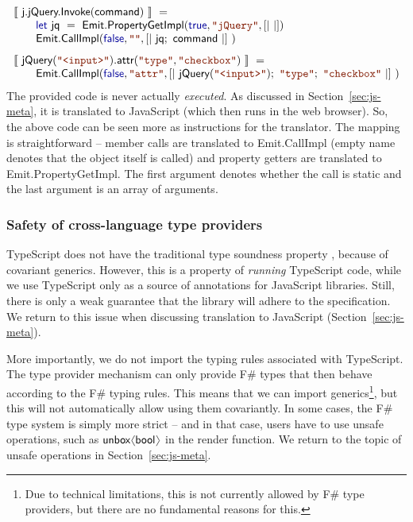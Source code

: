 \documentclass[submission,copyright,creativecommons]{eptcs}
\newcommand{\langl}{\begin{picture}(4.5,7)
\put(1.1,2.5){\rotatebox{60}{\line(1,0){5.5}}}
\put(1.1,2.5){\rotatebox{300}{\line(1,0){5.5}}}
\end{picture}}
\newcommand{\rangl}{\begin{picture}(4.5,7)
\put(.9,2.5){\rotatebox{120}{\line(1,0){5.5}}}
\put(.9,2.5){\rotatebox{240}{\line(1,0){5.5}}}
\end{picture}}
\newcommand{\sem}[1]{\llbracket #1 \rrbracket}
\newcommand{\kvd}[1]{\textnormal{\textcolor{kvdclr}{\sffamily #1}}}
\newcommand{\str}[1]{\textnormal{\textcolor{strclr}{\ttfamily "#1"}}}
\newcommand{\ident}[1]{\textnormal{\sffamily #1}}
\begin{document}
\begin{equation*}
\begin{array}{l}
 \sem{~\ident{j.jQuery.Invoke}(\ident{command})~} ~= \\
 \qquad \kvd{let}~\ident{jq}~=~\ident{Emit.PropertyGetImpl}(\kvd{true}, \str{jQuery}, \lbrack|~|\rbrack) \\
 \qquad \ident{Emit.CallImpl}(\kvd{false}, \str{}, \lbrack|~ \ident{jq};~ \ident{command}~|\rbrack~) \\[0.75em]
 \sem{~\ident{jQuery}(\str{<input>})\ident{.attr}(\str{type},\str{checkbox})~} ~= \\
 \qquad \ident{Emit.CallImpl}(\kvd{false}, \str{attr}, \lbrack|~ \ident{jQuery}(\str{<input>});~\str{type};~\str{checkbox}~|\rbrack~)
\end{array}
\end{equation*}
%
The provided code is never actually \emph{executed}. As discussed in Section~\ref{sec:js-meta}, it
is translated to JavaScript (which then runs in the web browser). So, the above code can be seen
more as instructions for the translator. The mapping is straightforward -- member calls are
translated to \ident{Emit.CallImpl} (empty name denotes that the object itself is called) and
property getters are translated to \ident{Emit.PropertyGetImpl}. The first argument
denotes whether the call is static and the last argument is an array of arguments.

\subsubsection{Safety of cross-language type providers}
TypeScript does not have the traditional type soundness property \cite{ms-safets},
because of covariant generics. However, this is a property of \emph{running} TypeScript code, while
we use TypeScript only as a source of annotations for JavaScript libraries. Still, there is only a
weak guarantee that the library will adhere to the specification. We return to this issue
when discussing translation to JavaScript (Section~\ref{sec:js-meta}).

More importantly, we do not import the typing rules associated with TypeScript.
The type provider mechanism can only provide F\# types that then behave according to the
F\# typing rules. This means that we can import generics\footnote{Due to technical
limitations, this is not currently allowed by F\# type providers, but there are no
fundamental reasons for this.}, but this will not automatically allow using them
covariantly. In some cases, the F\# type system is simply more strict -- and in that case,
users have to use unsafe operations, such as $\ident{unbox}\langl \ident{bool} \rangl$
in the \ident{render} function. We return to the topic of unsafe operations in
Section~\ref{sec:js-meta}.
\end{document}

